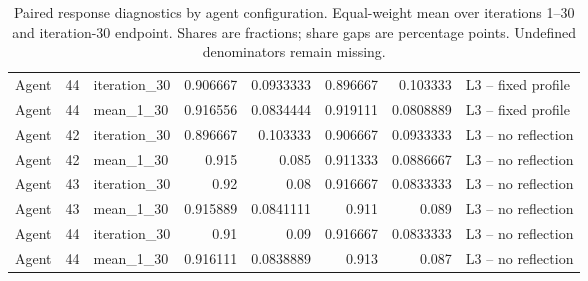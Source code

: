 \begin{table}[htbp!]
\begin{tabular}{lrlrrrrl}
Agent & 44 & iteration\_30 & 0.906667 & 0.0933333 & 0.896667 & 0.103333 & L3 -- fixed profile \\
Agent & 44 & mean\_1\_30 & 0.916556 & 0.0834444 & 0.919111 & 0.0808889 & L3 -- fixed profile \\
Agent & 42 & iteration\_30 & 0.896667 & 0.103333 & 0.906667 & 0.0933333 & L3 -- no reflection \\
Agent & 42 & mean\_1\_30 & 0.915 & 0.085 & 0.911333 & 0.0886667 & L3 -- no reflection \\
Agent & 43 & iteration\_30 & 0.92 & 0.08 & 0.916667 & 0.0833333 & L3 -- no reflection \\
Agent & 43 & mean\_1\_30 & 0.915889 & 0.0841111 & 0.911 & 0.089 & L3 -- no reflection \\
Agent & 44 & iteration\_30 & 0.91 & 0.09 & 0.916667 & 0.0833333 & L3 -- no reflection \\
Agent & 44 & mean\_1\_30 & 0.916111 & 0.0838889 & 0.913 & 0.087 & L3 -- no reflection \\
\hline
\end{tabular}
\caption{Paired response diagnostics by agent configuration. Equal-weight mean over iterations 1--30 and iteration-30 endpoint. Shares are fractions; share gaps are percentage points. Undefined denominators remain missing.}
\label{chap:results:tab:rq3_agents_actions}
\end{table}
